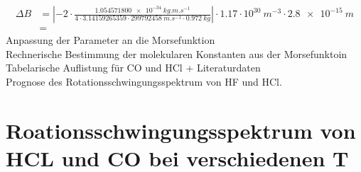 \begin{align}
\Delta B &= \left|-2\cdot \frac{\SI[mode=math]{1.054571800e-34}{kg.m.s^{-1}}}{4\cdot 3.14159265359 \cdot \SI[mode=math]{299792458}{m.s^{-1}} \cdot \SI[mode=math]{0.972}{kg} }\right|\cdot 1.17 \cdot 10^{30} ~\si{m^{-3}} \cdot \SI[mode=math]{2.8e-15}{m}
\\
&=
\end{align} 
Anpassung der Parameter an die Morsefunktion\\[5ex]
Rechnerische Bestimmung der molekularen Konstanten 
aus der Morsefunktoin\\[5ex]
Tabelarische Auflistung für CO und HCl + Literaturdaten\\[5ex]
Prognose des Rotationsschwingungsspektrum von HF und HCl.

\section{Roationsschwingungsspektrum von HCL und CO bei verschiedenen T}

